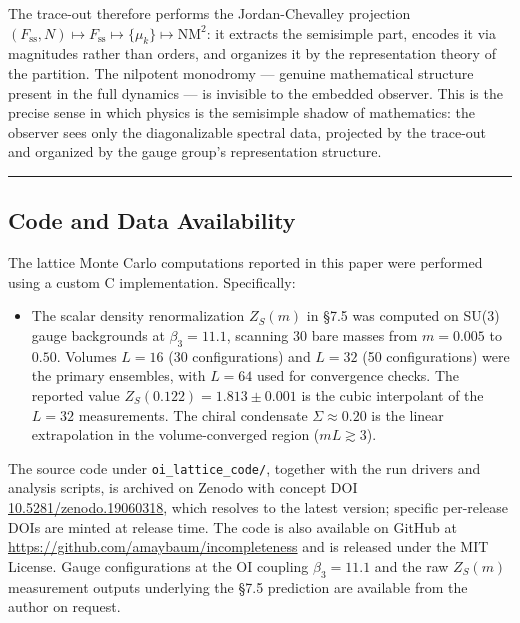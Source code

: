 \documentclass[
]{article}
\providecommand{\tightlist}{%
  \setlength{\itemsep}{0pt}\setlength{\parskip}{0pt}}
\begin{document}
The trace-out therefore performs the Jordan-Chevalley projection
\((F_{\mathrm{ss}}, N) \mapsto F_{\mathrm{ss}} \mapsto \{\mu_k\} \mapsto \mathrm{NM}^2\):
it extracts the semisimple part, encodes it via magnitudes rather than
orders, and organizes it by the representation theory of the partition.
The nilpotent monodromy --- genuine mathematical structure present in
the full dynamics --- is invisible to the embedded observer. This is the
precise sense in which physics is the semisimple shadow of mathematics:
the observer sees only the diagonalizable spectral data, projected by
the trace-out and organized by the gauge group's representation
structure.

\begin{center}\rule{0.5\linewidth}{0.5pt}\end{center}

\hypertarget{code-and-data-availability}{%
\subsection{Code and Data
Availability}\label{code-and-data-availability}}

The lattice Monte Carlo computations reported in this paper were
performed using a custom C implementation. Specifically:

\begin{itemize}
\tightlist
\item
  The scalar density renormalization \(Z_S(m)\) in §7.5 was computed on
  SU(3) gauge backgrounds at \(\beta_3 = 11.1\), scanning 30 bare masses
  from \(m = 0.005\) to \(0.50\). Volumes \(L = 16\) (30 configurations)
  and \(L = 32\) (50 configurations) were the primary ensembles, with
  \(L = 64\) used for convergence checks. The reported value
  \(Z_S(0.122) = 1.813 \pm 0.001\) is the cubic interpolant of the
  \(L = 32\) measurements. The chiral condensate \(\Sigma \approx 0.20\)
  is the linear extrapolation in the volume-converged region
  (\(mL \gtrsim 3\)).
\end{itemize}

The source code under \texttt{oi\_lattice\_code/}, together with the run
drivers and analysis scripts, is archived on Zenodo with concept DOI
\href{https://doi.org/10.5281/zenodo.19060318}{10.5281/zenodo.19060318},
which resolves to the latest version; specific per-release DOIs are
minted at release time. The code is also available on GitHub at
\url{https://github.com/amaybaum/incompleteness} and is released under
the MIT License. Gauge configurations at the OI coupling
\(\beta_3 = 11.1\) and the raw \(Z_S(m)\) measurement outputs underlying
the §7.5 prediction are available from the author on request.
\end{document}
